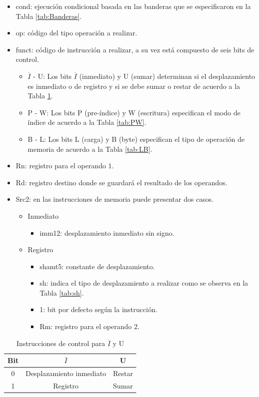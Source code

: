 \documentclass[journal,trans]{IEEEtran}
\begin{document}
	\begin{itemize}
		\item cond: ejecución condicional basada en las banderas que se especificaron en la Tabla \ref{tab:Banderas}.
		\item op: código del tipo operación a realizar.
		\item funct: código de instrucción a realizar, a su vez está compuesto de seis bits de control.
		\begin{itemize}
			\item $\overline{I}$ - U: Los bits $\overline{I}$ (inmediato) y U (sumar) determinan si el desplazamiento es inmediato o de registro y si se debe sumar o restar de acuerdo a la Tabla \ref{tab:IU}.
			\item P - W: Los bits P (pre-índice) y W (escritura) especifican el modo de índice de acuerdo a la Tabla \ref{tab:PW}.
			\item B - L: Los bits L (carga) y B (byte) especifican el tipo de operación de memoria de acuerdo a la Tabla \ref{tab:LB}.
		\end{itemize}
		\item Rn: registro para el operando $1$.
		\item Rd: registro destino donde se guardará el resultado de los operandos.
		\item Src2: en las instrucciones de memoria puede presentar dos casos.
		\begin{itemize}
			\item Inmediato
			\begin{itemize}
				\item imm12: desplazamiento inmediato sin signo.
			\end{itemize}
			\item Registro
			\begin{itemize}
				\item shamt5: constante de desplazamiento.
				\item sh: indica el tipo de desplazamiento a realizar como se observa en la Tabla \ref{tab:sh}.
				\item 1: bit por defecto según la instrucción.
				\item Rm: registro para el operando $2$.
			\end{itemize}
		\end{itemize}
	\end{itemize}
	
	\begin{table}[h]
		\centering
		\begin{tabular}{|c|c|c|}
			\hline
			Bit & $\overline{I}$           & U \\
			\hline
			\hline
			0   & Desplazamiento inmediato & Restar \\
			\hline
			1   & Registro                 & Sumar \\
			\hline
		\end{tabular}
		\caption{Instrucciones de control para $\overline{I}$ y U}
		\label{tab:IU}
	\end{table}
	
\end{document}
